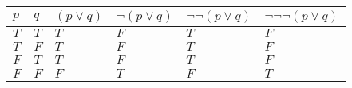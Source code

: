 \documentclass{article}%
\begin{document}
\begin{tabular}{l | l | l | l | l | l |}
    $p$ & $q$ & $(p \vee q)$            & $\neg (p \vee q)$             & $\neg \neg (p \vee q)$                & $\neg \neg \neg (p \vee q)$\\ \hline
    $T$ & $T$ & $T$                     & $F$                           & $T$                                   & $F$ \\ \hline
    $T$ & $F$ & $T$                     & $F$                           & $T$                                   & $F$ \\ \hline
    $F$ & $T$ & $T$                     & $F$                           & $T$                                   & $F$ \\ \hline
    $F$ & $F$ & $F$                     & $T$                           & $F$                                   & $T$ \\
    \hline
\end{tabular}\\
\\
\vspace{4mm}
\end{document}

